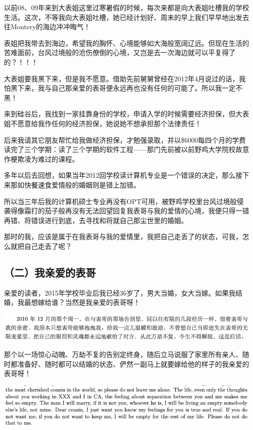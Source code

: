 \documentclass[9pt, b5paper]{article}
\begin{document}
以前08、09年来到大表姐这里过寒暑假的时候，每次来都是向大表姐吐槽我的学校生活。这次，不等我向大表姐吐槽，她已经计划好、周末的早上我们早早地出发去往Montery的海边冲冲晦气！

表姐把我带去到海边，希望我的胸怀、心境能够如大海般宽阔辽远。但现在生活的苦难面前，台风过境般的沧伤僚倒的心境，又岂是去一次海边就可以平复得了的？！！！

大表姐要我黑下来，但是我不愿意。借助先前舅舅曾经在2012年4月说过的话，我怕黑下来，我与自己那亲爱的表哥便永远再也没有任何的可能了。所以我一定不黑！

来到硅谷后，我找到一家挂靠身份的学校，申请入学的时候需要经济担保，但大表姐不愿意给我作任何的经济担保，她说她不想承担那个法律责任！

后来我请其它朋友帮忙给我做经济担保，才勉强录取，并以\$6000每四个月的学费读完了三个学期：读了三个学期的软件工程——那门先前被以前野鸡大学院校故意作梗欺凌为难过的课程。

多年以后去回想，如果当年2012回学校读计算机专业是一个错误的决定，那么接下来那如快餐速食爱情般的婚姻则是错上加错。

所以当三年后我的计算机硕士专业再没有OPT可用，被野鸡学校里台风过境般侵袭得像霜打的茄子般再没有无法回望回复我表哥与我的爱情的心境，我便只得一错再错、将错误进行到底，去寻找和将就自己那尘世里的婚姻。

那时的我，应该是属于在我表哥与我的爱情里，我把自己走丢了的状态，可我，怎么就把自己走丢了呢？

\subsection{（二）我亲爱的表哥}
\label{sec:org1f5b150}

亲爱的读者，2015年学校毕业后我已经36岁了，男大当婚，女大当嫁。如果我结婚，我最想嫁给谁？当然是我亲爱的表哥呀！

\begin{center}
\includegraphics[width=.9\linewidth]{./pic/backups_plans_20210426_112346.png}
\end{center}

那个以一场惊心动魄、万劫不复的告别定终身，随后立马说服了家里所有亲人、随时都准备好、随时都可以结婚的状态、俨然一副马上就要嫁给他的样子的我亲爱的表哥呀！

\begin{center}
\includegraphics[width=.9\linewidth]{./pic/backups_plans_20210423_201706.png}
\end{center}
\end{document}

